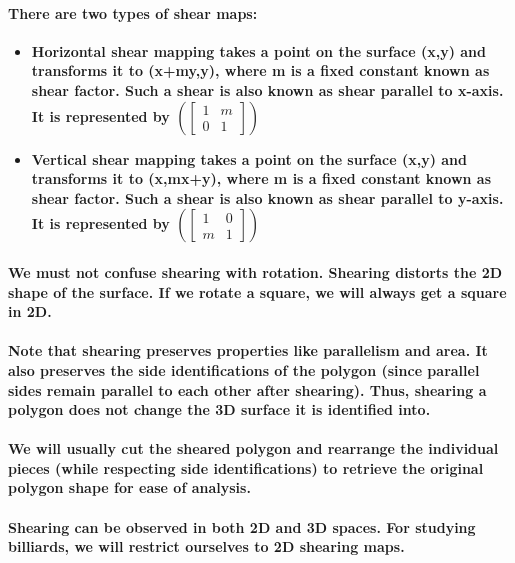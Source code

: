 \documentclass{report}
\begin{document}
\paragraph{There are two types of shear maps:}

\begin{itemize}
\item \textbf{Horizontal shear mapping takes a point on the surface (x,y) and transforms it to (x+my,y), where m is a fixed constant known as shear factor. Such a shear is also known as shear parallel to x-axis. It is represented by 
$ (\begin{bmatrix}
1&m\\0&1
\end{bmatrix})$ }

\item \textbf{Vertical shear mapping takes a point on the surface (x,y) and transforms it to (x,mx+y), where m is a fixed constant known as shear factor. Such a shear is also known as shear parallel to y-axis. It is represented by
$ (\begin{bmatrix}
1&0\\m&1
\end{bmatrix})$ }
\end{itemize}

\paragraph{We must not confuse shearing with rotation. Shearing distorts the 2D shape of the surface. If we rotate a square, we will always get a square in 2D.}

\paragraph{Note that shearing preserves properties like parallelism and area. It also preserves the side identifications of the polygon (since parallel sides remain parallel to each other after shearing). Thus, shearing a polygon does not change the 3D surface it is identified into.}

\paragraph{We will usually cut the sheared polygon and rearrange the individual pieces (while respecting side identifications) to retrieve the original polygon shape for ease of analysis.}

\paragraph{Shearing can be observed in both 2D and 3D spaces. For studying billiards, we will restrict ourselves to 2D shearing maps.}
\end{document}
